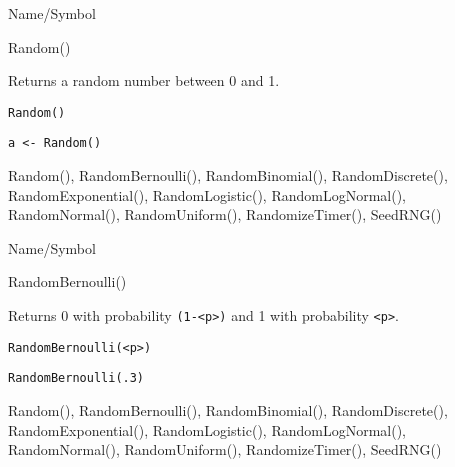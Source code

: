 \begin{desc}{Name/Symbol}
\item[Name/Symbol]	Random()

\item[Description]	Returns a random number between 0 and 1.

\item[Usage]
\begin{verbatim}
Random()
\end{verbatim}

\item[Example]
\begin{verbatim}
a <- Random()
\end{verbatim}

\item[See Also]		Random(), RandomBernoulli(), RandomBinomial(), RandomDiscrete(), RandomExponential(), RandomLogistic(), RandomLogNormal(), RandomNormal(), RandomUniform(), RandomizeTimer(), SeedRNG()
\end{desc}

\rl


\begin{desc}{Name/Symbol}
\item[Name/Symbol]	RandomBernoulli()

\item[Description]	Returns 0 with probability \verb+(1-<p>)+ and 1 with probability \verb+<p>+.

\item[Usage]		
\begin{verbatim}
RandomBernoulli(<p>)
\end{verbatim}

\item[Example]	
\begin{verbatim}
RandomBernoulli(.3)
\end{verbatim}

\item[See Also]		Random(), RandomBernoulli(), RandomBinomial(), RandomDiscrete(), RandomExponential(), RandomLogistic(),
	    	RandomLogNormal(), RandomNormal(), RandomUniform(),
	    	RandomizeTimer(), SeedRNG()    
\end{desc}

\rl


